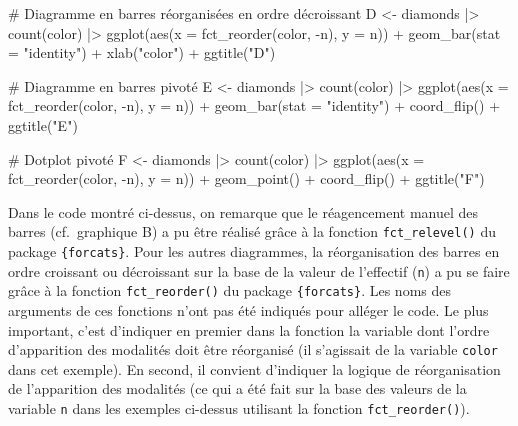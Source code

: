 \documentclass[
  letterpaper,
]{book}
\newenvironment{Shaded}{\begin{snugshade}}{\end{snugshade}}
\newcommand{\AttributeTok}[1]{\textcolor[rgb]{0.40,0.45,0.13}{#1}}
\newcommand{\CommentTok}[1]{\textcolor[rgb]{0.37,0.37,0.37}{#1}}
\newcommand{\FunctionTok}[1]{\textcolor[rgb]{0.28,0.35,0.67}{#1}}
\newcommand{\NormalTok}[1]{\textcolor[rgb]{0.00,0.23,0.31}{#1}}
\newcommand{\OtherTok}[1]{\textcolor[rgb]{0.00,0.23,0.31}{#1}}
\newcommand{\SpecialCharTok}[1]{\textcolor[rgb]{0.37,0.37,0.37}{#1}}
\newcommand{\StringTok}[1]{\textcolor[rgb]{0.13,0.47,0.30}{#1}}
\begin{document}
\begin{Shaded}
\begin{Highlighting}[]
\CommentTok{\# Diagramme en barres réorganisées en ordre décroissant}
\NormalTok{D }\OtherTok{\textless{}{-}} 
\NormalTok{  diamonds }\SpecialCharTok{|\textgreater{}}
  \FunctionTok{count}\NormalTok{(color) }\SpecialCharTok{|\textgreater{}}
  \FunctionTok{ggplot}\NormalTok{(}\FunctionTok{aes}\NormalTok{(}\AttributeTok{x =} \FunctionTok{fct\_reorder}\NormalTok{(color, }\SpecialCharTok{{-}}\NormalTok{n), }\AttributeTok{y =}\NormalTok{ n)) }\SpecialCharTok{+}
     \FunctionTok{geom\_bar}\NormalTok{(}\AttributeTok{stat =} \StringTok{"identity"}\NormalTok{) }\SpecialCharTok{+}
     \FunctionTok{xlab}\NormalTok{(}\StringTok{"color"}\NormalTok{) }\SpecialCharTok{+}
     \FunctionTok{ggtitle}\NormalTok{(}\StringTok{"D"}\NormalTok{) }

\CommentTok{\# Diagramme en barres pivoté}
\NormalTok{E }\OtherTok{\textless{}{-}} 
\NormalTok{  diamonds }\SpecialCharTok{|\textgreater{}}
  \FunctionTok{count}\NormalTok{(color) }\SpecialCharTok{|\textgreater{}}
  \FunctionTok{ggplot}\NormalTok{(}\FunctionTok{aes}\NormalTok{(}\AttributeTok{x =} \FunctionTok{fct\_reorder}\NormalTok{(color, }\SpecialCharTok{{-}}\NormalTok{n), }\AttributeTok{y =}\NormalTok{ n)) }\SpecialCharTok{+}
  \FunctionTok{geom\_bar}\NormalTok{(}\AttributeTok{stat =} \StringTok{"identity"}\NormalTok{) }\SpecialCharTok{+}
     \FunctionTok{coord\_flip}\NormalTok{() }\SpecialCharTok{+}
     \FunctionTok{ggtitle}\NormalTok{(}\StringTok{"E"}\NormalTok{)}

\CommentTok{\# Dotplot pivoté}
\NormalTok{F }\OtherTok{\textless{}{-}} 
\NormalTok{  diamonds }\SpecialCharTok{|\textgreater{}}
  \FunctionTok{count}\NormalTok{(color) }\SpecialCharTok{|\textgreater{}}
  \FunctionTok{ggplot}\NormalTok{(}\FunctionTok{aes}\NormalTok{(}\AttributeTok{x =} \FunctionTok{fct\_reorder}\NormalTok{(color, }\SpecialCharTok{{-}}\NormalTok{n), }\AttributeTok{y =}\NormalTok{ n)) }\SpecialCharTok{+}
     \FunctionTok{geom\_point}\NormalTok{() }\SpecialCharTok{+}
     \FunctionTok{coord\_flip}\NormalTok{() }\SpecialCharTok{+}
     \FunctionTok{ggtitle}\NormalTok{(}\StringTok{"F"}\NormalTok{)}
\end{Highlighting}
\end{Shaded}

Dans le code montré ci-dessus, on remarque que le réagencement manuel
des barres (cf.~graphique B) a pu être réalisé grâce à la fonction
\texttt{fct\_relevel()} du package \texttt{\{forcats\}}. Pour les autres
diagrammes, la réorganisation des barres en ordre croissant ou
décroissant sur la base de la valeur de l'effectif (\texttt{n}) a pu se
faire grâce à la fonction \texttt{fct\_reorder()} du package
\texttt{\{forcats\}}. Les noms des arguments de ces fonctions n'ont pas
été indiqués pour alléger le code. Le plus important, c'est d'indiquer
en premier dans la fonction la variable dont l'ordre d'apparition des
modalités doit être réorganisé (il s'agissait de la variable
\texttt{color} dans cet exemple). En second, il convient d'indiquer la
logique de réorganisation de l'apparition des modalités (ce qui a été
fait sur la base des valeurs de la variable \texttt{n} dans les exemples
ci-dessus utilisant la fonction \texttt{fct\_reorder()}).
\end{document}
